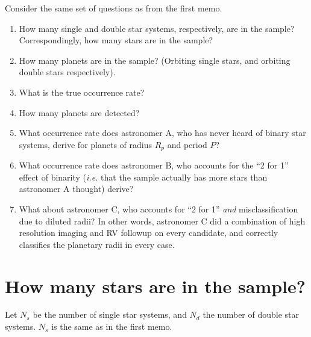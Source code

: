 \documentclass{emulateapj}
\begin{document}
Consider the same set of questions as from the first memo.
\begin{enumerate}
\item How many single and double star systems, respectively, are in the sample?
Correspondingly, how many stars are in the sample?

\item How many planets are in the sample? (Orbiting single stars, and orbiting 
double stars respectively).

\item What is the true occurrence rate?

\item How many planets are detected?

\item What occurrence rate does astronomer A, who has never heard of binary 
star systems, derive for planets of radius $R_p$ and period $P$?

\item What occurrence rate does astronomer B, who accounts for the ``2 for 1'' 
effect of binarity (\textit{i.e.} that the sample actually has more stars than 
astronomer A thought) derive?

\item What about astronomer C, who accounts for ``2 for 1'' \textit{and} 
misclassification due to diluted radii? In other words, astronomer C did a 
combination of high resolution imaging and RV followup on every candidate, and
correctly classifies the planetary radii in every case.
\end{enumerate}


\section{How many stars are in the sample?}
\label{sec:how_many_stars}

Let $N_s$ be the number of single star systems, and $N_d$ the number of double 
star systems. $N_s$ is the same as in the first memo.
\end{document}
